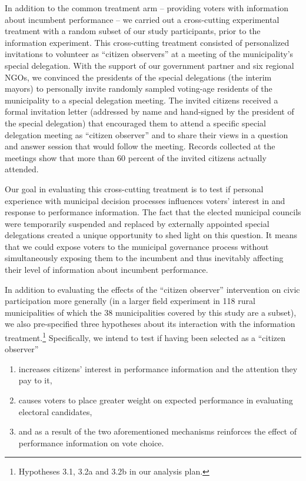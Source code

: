 \documentclass[11pt]{article}
\begin{document}
In addition to the common treatment arm -- providing voters with information about incumbent performance -- we carried out a cross-cutting experimental treatment with a random subset of our study participants, prior to the information experiment. This cross-cutting treatment consisted of personalized invitations to volunteer as ``citizen observers'' at a meeting of the municipality's special delegation. With the support of our government partner and six regional NGOs, we convinced the presidents of the special delegations (the interim mayors) to personally invite randomly sampled voting-age residents of the municipality to a special delegation meeting. The invited citizens received a formal invitation letter (addressed by name and hand-signed by the president of the special delegation) that encouraged them to attend a specific special delegation meeting as ``citizen observer'' and to share their views in a question and answer session that would follow the meeting. Records collected at the meetings show that more than 60 percent of the invited citizens actually attended. 

Our goal in evaluating this cross-cutting treatment is to test if personal experience with municipal decision processes influences voters' interest in and response to performance information. The fact that the elected municipal councils were temporarily suspended and replaced by externally appointed special delegations created a unique opportunity to shed light on this question. It means that we could expose voters to the municipal governance process without simultaneously exposing them to the incumbent and thus inevitably affecting their level of information about incumbent performance. 

In addition to evaluating the effects of the ``citizen observer'' intervention on civic participation more generally (in a larger field experiment in 118 rural municipalities \citep{CitizenObserverPAP} of which the 38 municipalities covered by this study are a subset), we also pre-specified three hypotheses about its interaction with the information treatment.\footnote{Hypotheses 3.1, 3.2a and 3.2b in our analysis plan.} Specifically, we intend to test if having been selected as a ``citizen observer''
\begin{enumerate}
\item increases citizens' interest in performance information and the attention they pay to it, 
\item causes voters to place greater weight on expected performance in evaluating electoral candidates, 
\item and as a result of the two aforementioned mechanisms reinforces the effect of performance information on vote choice. 
\end{enumerate}
\end{document}
